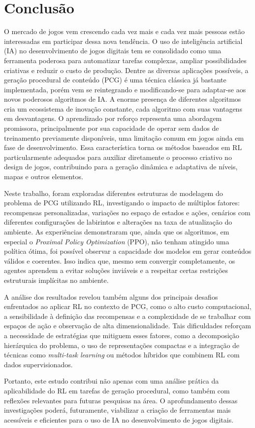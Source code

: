 \chapter{Conclusão}
O mercado de jogos vem crescendo cada vez mais e cada vez mais pessoas estão interessadas em participar
dessa nova tendência. O uso de inteligência artificial (IA) no desenvolvimento de jogos digitais tem se 
consolidado como uma ferramenta poderosa para automatizar tarefas complexas, ampliar possibilidades criativas 
e reduzir o custo de produção. Dentre as diversas aplicações possíveis, a geração procedural de conteúdo (PCG) é uma
técnica clássica já bastante implementada, porém vem se reintegrando e modificando-se para adaptar-se aos novos
poderosos algoritmos de IA. A enorme presença de diferentes algoritmos cria um ecossistema de inovação constante,
cada algoritmo com suas vantagens em desvantagens. O aprendizado por reforço representa uma abordagem promissora, 
principalmente por sua capacidade de operar sem dados de treinamento previamente disponíveis, uma limitação comum em jogos
ainda em fase de desenvolvimento. Essa característica torna os métodos baseados em RL particularmente adequados 
para auxiliar diretamente o processo criativo no design de jogos, contribuindo para a geração dinâmica 
e adaptativa de níveis, mapas e outros elementos.

Neste trabalho, foram exploradas diferentes estruturas de modelagem do problema de PCG utilizando RL, investigando o 
impacto de múltiplos fatores: recompensas personalizadas, variações no espaço de estados e ações, cenários com diferentes 
configurações de labirintos e alterações na taxa de atualização do ambiente. As experiências demonstraram que, 
ainda que os algoritmos, em especial o \textit{Proximal Policy Optimization} (PPO), não tenham atingido uma política ótima, 
foi possível observar a capacidade dos modelos em gerar conteúdos válidos e coerentes. 
Isso indica que, mesmo sem convergir completamente, os agentes aprendem a evitar soluções inviáveis e a respeitar certas 
restrições estruturais implícitas no ambiente.

A análise dos resultados revelou também alguns dos principais desafios enfrentados ao aplicar RL no contexto de PCG, 
como o alto custo computacional, a sensibilidade à definição das recompensas e a complexidade de se trabalhar com espaços de ação e 
observação de alta dimensionalidade. Tais dificuldades reforçam a necessidade de estratégias que mitiguem esses 
fatores, como a decomposição hierárquica do problema, o uso de representações compactas e a 
integração de técnicas como \textit{multi-task learning} ou métodos híbridos que combinem RL com dados supervisionados.

Portanto, este estudo contribui não apenas com uma análise prática da aplicabilidade do RL em tarefas de geração procedural, 
como também com reflexões relevantes para futuras pesquisas na área. O aprofundamento dessas investigações poderá, 
futuramente, viabilizar a criação de ferramentas mais acessíveis e eficientes para o uso de IA no desenvolvimento de 
jogos digitais.